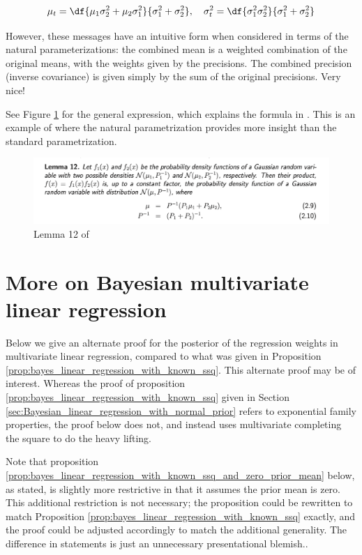 \documentclass{article} %
\begin{document}
\[ \mu_t = \df{\mu_1 \sigma^2_2 + \mu_2 \sigma^2_1}{\sigma^2_1 + \sigma^2_2}  , \quad \sigma^2_t = \df{\sigma^2_1 \sigma^2_2}{ \sigma^2_1 + \sigma^2_2} \]

However, these messages have an intuitive form when considered in terms of the natural parameterizations:  the combined mean is a weighted combination of the original means, with the weights given by the precisions.   The combined precision (inverse covariance) is given simply by the sum of the original precisions.  Very nice! 

 See Figure \ref{fig:lemma_twelve_bickson} for the general expression, which explains the formula in  \cite{krishnan2016structured}.  This is an example of where the natural parametrization provides more insight than the standard parametrization. 

\begin{figure}[H]
\includegraphics[width=\textwidth]{images/bickson_lemma_12}
\caption{Lemma 12 of \cite{bickson2008gaussian}}
\label{fig:lemma_twelve_bickson}
\end{figure}

\section{More on Bayesian multivariate linear regression}  \label{sec:more_bayesian_multivariate_linear_regression} 

Below we give an alternate proof for the posterior of the regression weights in multivariate linear regression,  compared to what was given in Proposition \ref{prop:bayes_linear_regression_with_known_ssq}.   This alternate proof may be of interest.   Whereas the proof of proposition \ref{prop:bayes_linear_regression_with_known_ssq} given in Section  \ref{sec:Bayesian_linear_regression_with_normal_prior} refers to exponential family properties,  the proof below does not,  and instead uses multivariate completing the square to do the heavy lifting. 

Note that proposition 
\ref{prop:bayes_linear_regression_with_known_ssq_and_zero_prior_mean} below, as stated,  is slightly more restrictive in that it assumes the prior mean is zero.   This additional restriction is not necessary; the proposition could be rewritten to match 
Proposition \ref{prop:bayes_linear_regression_with_known_ssq} exactly,  and the proof could be adjusted accordingly to match the additional generality.    The difference in statements is just an unnecessary presentational blemish..
\end{document}
